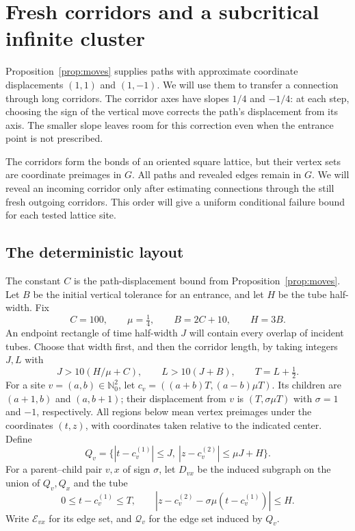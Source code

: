 \section{Fresh corridors and a subcritical infinite cluster}
\label{sec:corridor-exploration}

Proposition~\ref{prop:moves} supplies paths with approximate coordinate
displacements $(1,1)$ and $(1,-1)$. We will use them to transfer a
connection through long corridors. The corridor axes have slopes $1/4$ and $-1/4$:
at each step, choosing the sign of the vertical move corrects the
path's displacement from its axis. The smaller slope leaves room for
this correction even when the entrance point is not prescribed.

The corridors form the bonds of an oriented square lattice, but their
vertex sets are coordinate preimages in $G$. All paths and revealed
edges remain in $G$. We will reveal an incoming corridor only after
estimating connections through the still fresh outgoing corridors.
This order will give a uniform conditional failure bound for each
tested lattice site.

\subsection{The deterministic layout}

The constant $C$ is the path-displacement bound from
Proposition~\ref{prop:moves}. Let $B$ be the initial vertical tolerance
for an entrance, and let $H$ be the tube half-width. Fix
\[
 C=100,\qquad \mu=\tfrac14,\qquad B=2C+10,\qquad H=3B.
\]
An endpoint rectangle of time half-width $J$ will contain every overlap
of incident tubes. Choose that width first, and then the corridor
length, by taking integers $J,L$ with
\[
 J>10(H/\mu+C),\qquad L>10(J+B),\qquad T=L+\tfrac12.
\]
For a site $v=(a,b)\in\mathbb N_0^2$, let
$c_v=((a+b)T,(a-b)\mu T)$. Its children are $(a+1,b)$ and
$(a,b+1)$; their displacement from $v$ is $(T,\sigma\mu T)$ with
$\sigma=1$ and $-1$, respectively. All regions below mean vertex
preimages under the coordinates $(t,z)$, with coordinates taken
relative to the indicated center. Define
\[
 Q_v=\{|t-c_v^{(1)}|\le J,\
          |z-c_v^{(2)}|\le\mu J+H\}.
\]
For a parent--child pair $v,x$ of sign $\sigma$, let $D_{vx}$ be the
induced subgraph on the union of $Q_v,Q_x$ and the tube
\[
 0\le t-c_v^{(1)}\le T,\qquad
 |z-c_v^{(2)}-\sigma\mu(t-c_v^{(1)})|\le H.
\]
Write $\mathcal E_{vx}$ for its edge set, and $\mathcal Q_v$ for
the edge set induced by $Q_v$.

